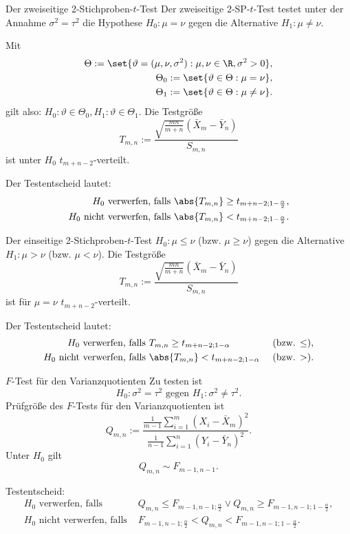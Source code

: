 \begin{karte}{Der zweiseitige 2-Stichproben-\(t\)-Test}
Der zweiseitige 2-SP-\(t\)-Test testet unter der Annahme \(\sigma^2 = \tau^2\)
die Hypothese \(H_0: \mu = \nu\) gegen die Alternative \(H_1: \mu \neq \nu\).

Mit \begin{align*}
    \Theta := \set{\vartheta = (\mu, \nu, \sigma^2): \mu, \nu \in \R, \sigma^2 > 0},\\
    \Theta_0 := \set{\vartheta \in \Theta: \mu = \nu},\\
    \Theta_1 := \set{\vartheta \in \Theta: \mu \neq \nu}.
\end{align*}
gilt also: \( H_0: \vartheta \in \Theta_0, H_1: \vartheta \in \Theta_1 \). Die Testgröße 
\[ T_{m,n} := \frac{\sqrt{\frac{mn}{m+n}} (\bar{X}_m - \bar{Y}_n)}{S_{m,n}} \]
ist unter \(H_0\) \(t_{m+n-2}\)-verteilt. 

Der Testentscheid lautet: 
\begin{align*}
    H_0 \text{ verwerfen, falls } & \abs{T_{m,n}} \geq t_{m+n-2; 1-\frac{\alpha}{2}}, \\
    H_0 \text{ nicht verwerfen, falls } & \abs{T_{m,n}} < t_{m+n-2; 1-\frac{\alpha}{2}}.
\end{align*}
\end{karte}

\begin{karte}{Der einseitige 2-Stichproben-\(t\)-Test}
\(H_0: \mu \leq \nu\) (bzw. \(\mu \geq \nu\)) gegen die Alternative 
\(H_1: \mu > \nu\) (bzw. \(\mu < \nu\)). 
Die Testgröße 
\[ T_{m,n} := \frac{\sqrt{\frac{mn}{m+n}} (\bar{X}_m - \bar{Y}_n)}{S_{m,n}} \]
ist für \(\mu = \nu\) \(t_{m+n-2}\)-verteilt.

Der Testentscheid lautet: 
\begin{align*}
    H_0 \text{ verwerfen, falls } & T_{m,n} \geq t_{m+n-2; 1-\alpha} &\text{ (bzw. \(\leq\))}, \\
    H_0 \text{ nicht verwerfen, falls } & \abs{T_{m,n}} < t_{m+n-2; 1-\alpha} &\text{ (bzw. \(>\))}.
\end{align*}
\end{karte}

\begin{karte}{\(F\)-Test für den Varianzquotienten}
Zu testen ist 
\[ H_0: \sigma^2 = \tau^2 \text{ gegen } H_1: \sigma^2 \neq \tau^2. \]
Prüfgröße des \(F\)-Tests für den Varianzquotienten ist 
\[ Q_{m,n} := \frac{\frac{1}{m-1} \sum_{i=1}^m (X_i - \bar{X}_m)^2}{\frac{1}{n-1} \sum_{i=1}^n (Y_i - \bar{Y}_n)^2}. \]
Unter \(H_0\) gilt 
\[ Q_{m,n} \sim F_{m-1,n-1}. \]

Testentscheid: 
\begin{align*}
    H_0 \text{ verwerfen, falls } & Q_{m,n} \leq F_{m-1,n-1;\frac{\alpha}{2}} \vee Q_{m,n} \geq F_{m-1,n-1;1-\frac{\alpha}{2}}, \\
    H_0 \text{ nicht verwerfen, falls } & F_{m-1,n-1;\frac{\alpha}{2}} < Q_{m,n} < F_{m-1,n-1;1-\frac{\alpha}{2}}.
\end{align*}
\end{karte}

